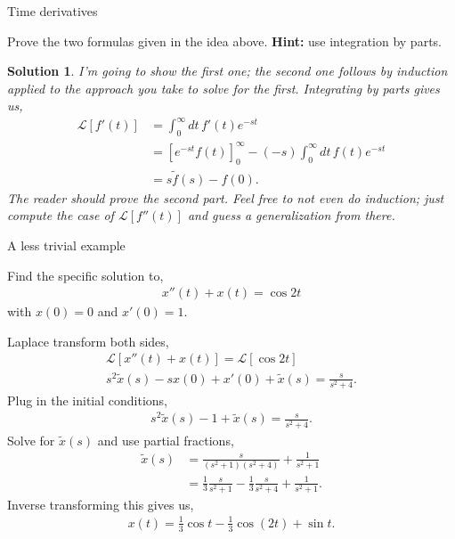 \documentclass[11pt]{article}
\newtheorem*{solution}{Solution}
\theoremstyle{mystyle}
\begin{document}
\begin{psexample}{Time derivatives}{}
    \begin{hwproblem}
        Prove the two formulas given in the idea above. \textbf{Hint:} use
        integration by parts.
    \end{hwproblem}
    \begin{solution}
        I'm going to show the first one; the second one follows
        by induction applied to the approach you take to solve
        for the first. Integrating by parts gives us,
        \begin{align*}
            \mathcal{L}[f'(t)] & = \int_0^\infty dt \, f'(t) e^{-st}\\
            & = [e^{-st} f(t) ]_0^\infty - (-s) \int_0^\infty dt \, f(t) e^{-st}\\
            & = s\tilde{f}(s) - f(0).
        \end{align*}
        The reader should prove the second part. Feel free to
        not even do induction; just compute the case of $\mathcal{L}[f''(t)]$
        and guess a generalization from there.
    \end{solution}
\end{psexample}


\begin{psexample}{A less trivial example}{}
    \begin{hwproblem}
        Find the specific solution to,
        \begin{align*}
            x''(t) + x(t) = \cos{2t}
        \end{align*}
        with $x(0) = 0$ and $x'(0) = 1$.
    \end{hwproblem}   
\end{psexample}

\begin{pssolution}{}{}
    Laplace transform both sides,
    \begin{align*}
       \mathcal{L}[x''(t) + x(t)] = \mathcal{L}[\cos{2t}]\\
       s^2 \tilde{x}(s) - sx(0) + x'(0) + \tilde{x}(s) = \frac{s}{s^2 + 4}.
    \end{align*}
    Plug in the initial conditions,
    \begin{align*}
        s^2 \tilde{x}(s) - 1 + \tilde{x}(s) = \frac{s}{s^2 + 4}.
    \end{align*}
    Solve for $\tilde{x}(s)$ and use partial fractions,
    \begin{align*} 
        \tilde{x}(s) & = \frac{s}{(s^2 + 1)(s^2 + 4)} + \frac{1}{s^2 + 1}\\
        & = \frac{1}{3} \frac{s}{s^2 + 1} - \frac{1}{3}\frac{s}{s^2 + 4} + \frac{1}{s^2 + 1}.
    \end{align*}
    Inverse transforming this gives us,
    \begin{align*}
        x(t) = \frac{1}{3}\cos{t} - \frac{1}{3} \cos{(2t)} + \sin{t}.
    \end{align*}
\end{pssolution}
\end{document}
